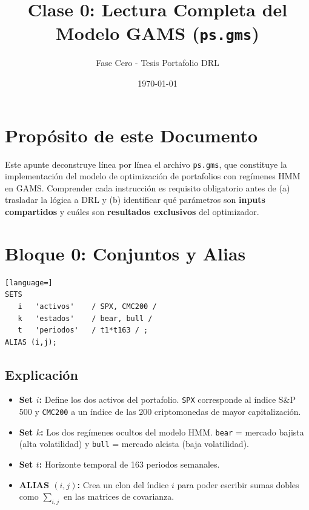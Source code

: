 \documentclass[11pt,a4paper]{article}
\title{\textbf{Clase 0: Lectura Completa del Modelo GAMS (\texttt{ps.gms})}}
\author{Fase Cero - Tesis Portafolio DRL}
\date{\today}
\begin{document}
\maketitle

\section*{Propósito de este Documento}
Este apunte deconstruye línea por línea el archivo \texttt{ps.gms}, que constituye la implementación del modelo de optimización de portafolios con regímenes HMM en GAMS. Comprender cada instrucción es requisito obligatorio antes de (a) trasladar la lógica a DRL y (b) identificar qué parámetros son \textbf{inputs compartidos} y cuáles son \textbf{resultados exclusivos} del optimizador.

\section{Bloque 0: Conjuntos y Alias}

\begin{lstlisting}[language=]
SETS
   i   'activos'    / SPX, CMC200 /
   k   'estados'    / bear, bull /
   t   'periodos'   / t1*t163 / ;
ALIAS (i,j);
\end{lstlisting}

\subsection{Explicación}
\begin{itemize}
    \item \textbf{Set $i$:} Define los dos activos del portafolio. \texttt{SPX} corresponde al índice S\&P 500 y \texttt{CMC200} a un índice de las 200 criptomonedas de mayor capitalización.
    \item \textbf{Set $k$:} Los dos regímenes ocultos del modelo HMM. \texttt{bear} = mercado bajista (alta volatilidad) y \texttt{bull} = mercado alcista (baja volatilidad).
    \item \textbf{Set $t$:} Horizonte temporal de 163 periodos semanales.
    \item \textbf{ALIAS $(i,j)$:} Crea un clon del índice $i$ para poder escribir sumas dobles como $\sum_{i,j}$ en las matrices de covarianza.
\end{itemize}

\end{document}
